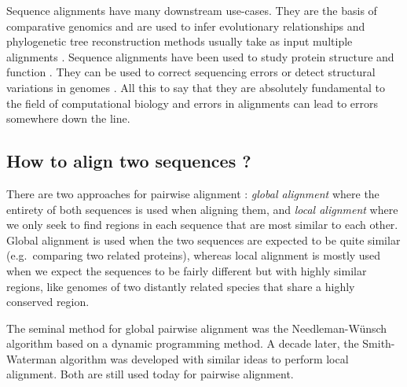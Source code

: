 \documentclass[
  11pt,
  twoside,
  BCOR=10mm,
  listof=totoc]{scrbook}
\begin{document}
Sequence alignments have many downstream use-cases. They are the basis of comparative genomics \autocite{hardisonComparativeGenomics2003} and are used to infer evolutionary relationships and phylogenetic tree reconstruction methods usually take as input multiple alignments \autocite{felsensteinEvolutionaryTreesDNA1981,kumarMEGAMolecularEvolutionary1994,kozlovRAxMLNGFastScalable2019,guindonNewAlgorithmsMethods2010,priceFastTreeApproximatelyMaximumLikelihood2010}. Sequence alignments have been used to study protein structure \autocites[ ]{jumperHighlyAccurateProtein2021,karplusPredictingProteinStructure1999} and function \autocite{watsonPredictingProteinFunction2005,leePredictingProteinFunction2007}. They can be used to correct sequencing errors \autocite{hacklProovreadLargescaleHighaccuracy2014,korenHybridErrorCorrection2012,salmelaCorrectingErrorsShort2011} or detect structural variations in genomes \autocite{medvedevComputationalMethodsDiscovering2009,mahmoudStructuralVariantCalling2019}. All this to say that they are absolutely fundamental to the field of computational biology and errors in alignments can lead to errors somewhere down the line.

\hypertarget{how-to-align-two-sequences}{%
\subsection{How to align two sequences ?}\label{how-to-align-two-sequences}}

There are two approaches for pairwise alignment \autocite{sungAlgorithmsBioinformaticsPractical2011}: \emph{global alignment} where the entirety of both sequences is used when aligning them, and \emph{local alignment} where we only seek to find regions in each sequence that are most similar to each other. Global alignment is used when the two sequences are expected to be quite similar (e.g.~comparing two related proteins), whereas local alignment is mostly used when we expect the sequences to be fairly different but with highly similar regions, like genomes of two distantly related species that share a highly conserved region.

The seminal method for global pairwise alignment was the Needleman-Wünsch algorithm \autocite{needlemanGeneralMethodApplicable1970} based on a dynamic programming method. A decade later, the Smith-Waterman algorithm \autocite{smithIdentificationCommonMolecular1981} was developed with similar ideas to perform local alignment. Both are still used today for pairwise alignment.
\end{document}
